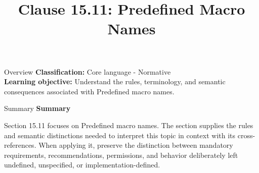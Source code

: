 \documentclass[10pt,letterpaper]{article}
\title{Clause 15.11: Predefined Macro Names}
\author{}
\date{}
\begin{document}
\maketitle
\begin{CornellOverviewBox}{Overview}
\textbf{Classification:} Core language - Normative\\[2pt]
\textbf{Learning objective:} Understand the rules, terminology, and semantic consequences associated with Predefined macro names.
\end{CornellOverviewBox}\begin{CornellSummaryBox}{Summary}
{\sffamily\bfseries\color{Accent} Summary}\par\vspace{3pt}Section 15.11 focuses on Predefined macro names. The section supplies the rules and semantic distinctions needed to interpret this topic in context with its cross-references. When applying it, preserve the distinction between mandatory requirements, recommendations, permissions, and behavior deliberately left undefined, unspecified, or implementation-defined.
\end{CornellSummaryBox}
\end{document}
